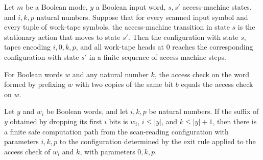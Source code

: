 \begin{lemma}
\label{Complexity.LogProg.access_jump}
\leanok
{}
Let $m$ be a Boolean mode, $y$ a Boolean input word, $s,s'$ access-machine states, and
$i,k,p$ natural numbers. Suppose that for every scanned input symbol and every tuple of
work-tape symbols, the access-machine transition in state $s$ is the stationary action
that moves to state $s'$. Then the configuration with state $s$, tapes encoding
$i,0,k,p$, and all work-tape heads at $0$ reaches the corresponding configuration with
state $s'$ in a finite sequence of access-machine steps.
\end{lemma}

\begin{lemma}
\label{Complexity.LogProg.accessCheck_dup}
\leanok
{}
For Boolean words $w$ and any natural number $k$, the access check on the word formed by
prefixing $w$ with two copies of the same bit $b$ equals the access check on $w$.
\end{lemma}

\begin{lemma}
\label{Complexity.LogProg.access_scan_run}
\leanok
{}
Let $y$ and $w_i$ be Boolean words, and let $i,k,p$ be natural numbers. If the suffix of
$y$ obtained by dropping its first $i$ bits is $w_i$, $i\le |y|$, and $k\le |y|+1$, then
there is a finite safe computation path from the scan-reading configuration with
parameters $i,k,p$ to the configuration determined by the exit rule applied to the
access check of $w_i$ and $k$, with parameters $0,k,p$.
\end{lemma}

